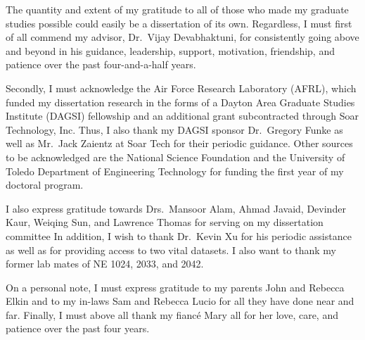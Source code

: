 \documentclass[12pt]{uthesis-v12}  %
\begin{document}
\begin{acknowledgments}
The quantity and extent of my gratitude to all of those who made my graduate studies possible could easily be a dissertation of its own. Regardless, I must first of all commend my advisor, Dr.~Vijay Devabhaktuni, for consistently going above and beyond in his guidance, leadership, support, motivation, friendship, and patience over the past four-and-a-half years. 

Secondly, I must acknowledge the Air Force Research Laboratory (AFRL), which funded my dissertation research in the forms of a Dayton Area Graduate Studies Institute (DAGSI) fellowship and an additional grant subcontracted through Soar Technology, Inc. Thus, I also thank my DAGSI sponsor Dr.~Gregory Funke as well as Mr.~Jack Zaientz at Soar Tech for their periodic guidance. Other sources to be acknowledged are the National Science Foundation and the University of Toledo Department of Engineering Technology for funding the first year of my doctoral program.

I also express gratitude towards Drs.~Mansoor Alam, Ahmad Javaid, Devinder Kaur, Weiqing Sun, and Lawrence Thomas for serving on my dissertation committee In addition, I wish to thank Dr.~Kevin Xu for his periodic assistance as well as for providing access to two vital datasets. I also want to thank my former lab mates of NE 1024, 2033, and 2042.

On a personal note, I must express gratitude to my parents John and Rebecca Elkin and to my in-laws Sam and Rebecca Lucio for all they have done near and far. Finally, I must above all thank my fianc\'e Mary all for her love, care, and patience over the past four years.

\end{acknowledgments}

\end{document}
